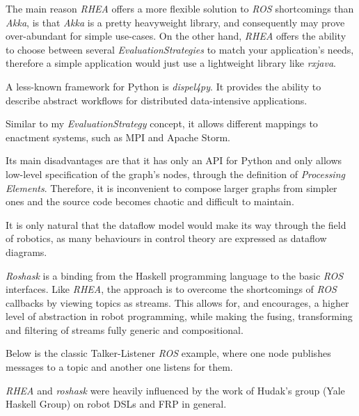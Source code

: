 \documentclass{dithesis}
\begin{document}
The main reason \textit{RHEA} offers a more flexible solution to \textit{ROS} shortcomings than \textit{Akka}, is that \textit{Akka} is a pretty heavyweight library, and consequently may prove over-abundant for simple use-cases. On the other hand, \textit{RHEA} offers the ability to choose between several \textit{EvaluationStrategies} to match your application's needs, therefore a simple application would just use a lightweight library like \textit{rxjava}.


A less-known framework for Python is \textit{dispel4py}\cite{dispel}. It provides the ability to describe abstract workflows for distributed data-intensive applications.

Similar to my \textit{EvaluationStrategy} concept, it allows different mappings to enactment systems, such as MPI\cite{mpi} and Apache Storm\cite{storm}.

Its main disadvantages are that it has only an API for Python and only allows low-level specification of the graph's nodes, through the definition of \textit{Processing Elements}. Therefore, it is inconvenient to compose larger graphs from simpler ones and the source code becomes chaotic and difficult to maintain.


It is only natural that the dataflow model would make its way through the field of robotics, as many behaviours in control theory are expressed as dataflow diagrams. 


\textit{Roshask}\cite{roshask} is a binding from the Haskell programming language to the basic \textit{ROS} interfaces. Like \textit{RHEA}, the approach is to overcome the shortcomings of \textit{ROS} callbacks by viewing topics as streams. This allows for, and encourages, a higher level of abstraction in robot programming, while making the fusing, transforming and filtering of streams fully generic and compositional. 

Below is the classic Talker-Listener \textit{ROS} example, where one node publishes messages to a topic and another one listens for them.



\textit{RHEA} and \textit{roshask} were heavily influenced by the work of Hudak's group (Yale Haskell Group) on robot DSLs and FRP in general\cite{fran, arrows_robots,lambda_in_motion,event_frp,real_frp,pushpull_frp}.
\end{document}
